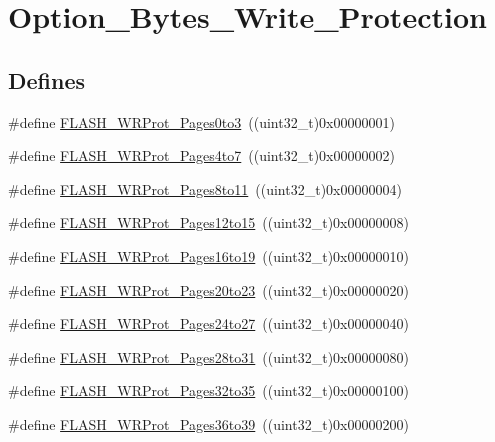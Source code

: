 \hypertarget{group__Option__Bytes__Write__Protection}{
\section{Option\_\-Bytes\_\-Write\_\-Protection}
\label{group__Option__Bytes__Write__Protection}
}
\subsection*{Defines}
\begin{DoxyCompactItemize}
\item 
\#define \hyperlink{group__Option__Bytes__Write__Protection_gac5c6f6155e4ebae0978a3d2a0d991e68}{FLASH\_\-WRProt\_\-Pages0to3}~((uint32\_\-t)0x00000001)
\item 
\#define \hyperlink{group__Option__Bytes__Write__Protection_ga1b33c4de30c55331e7e60c0795c824ad}{FLASH\_\-WRProt\_\-Pages4to7}~((uint32\_\-t)0x00000002)
\item 
\#define \hyperlink{group__Option__Bytes__Write__Protection_ga7eca7a8b11accdd6dadf3445847e1a57}{FLASH\_\-WRProt\_\-Pages8to11}~((uint32\_\-t)0x00000004)
\item 
\#define \hyperlink{group__Option__Bytes__Write__Protection_gaa02b9439f75982e2e1c14f8af9a8c091}{FLASH\_\-WRProt\_\-Pages12to15}~((uint32\_\-t)0x00000008)
\item 
\#define \hyperlink{group__Option__Bytes__Write__Protection_gaa589ce30909c3a9a0bffc8a59b6013fb}{FLASH\_\-WRProt\_\-Pages16to19}~((uint32\_\-t)0x00000010)
\item 
\#define \hyperlink{group__Option__Bytes__Write__Protection_ga537e0f85899e13ca2ed93455e537d950}{FLASH\_\-WRProt\_\-Pages20to23}~((uint32\_\-t)0x00000020)
\item 
\#define \hyperlink{group__Option__Bytes__Write__Protection_ga1d6b94b48e0dd21949139267b90a08ef}{FLASH\_\-WRProt\_\-Pages24to27}~((uint32\_\-t)0x00000040)
\item 
\#define \hyperlink{group__Option__Bytes__Write__Protection_ga800860d071cfb40b1b0e94111a0cb549}{FLASH\_\-WRProt\_\-Pages28to31}~((uint32\_\-t)0x00000080)
\item 
\#define \hyperlink{group__Option__Bytes__Write__Protection_ga81a4250850e5fe7c251365cc22839a96}{FLASH\_\-WRProt\_\-Pages32to35}~((uint32\_\-t)0x00000100)
\item 
\#define \hyperlink{group__Option__Bytes__Write__Protection_ga783f47425af52b9a12914520d9ee175e}{FLASH\_\-WRProt\_\-Pages36to39}~((uint32\_\-t)0x00000200)

\end{DoxyCompactItemize}
